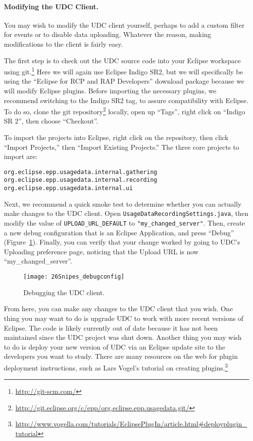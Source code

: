 \paragraph{Modifying the UDC Client.}

You may wish to modify the UDC client yourself, perhaps to add a custom filter for events
or to disable data uploading.
Whatever the reason, making modifications to the client is fairly easy.

The first step is to check out the UDC source code into your Eclipse
workspace using git.\footnote{\url{http://git-scm.com/}}
Here we will again use Eclipse Indigo SR2, but we will specifically be using the
``Eclipse for RCP and RAP Developers'' download package because we will
modify Eclipse plugins.
Before importing the necessary plugins, we recommend switching to
the Indigo SR2 tag, to assure compatibility with
Eclipse.
To do so, clone the git repository\footnote{\url{http://git.eclipse.org/c/epp/org.eclipse.epp.usagedata.git/}}
locally, open up ``Tags'', right click on ``Indigo SR 2'',
then choose ``Checkout''.

To import the projects into Eclipse, right click on the repository, then click
``Import Projects,'' then ``Import Existing Projects.''
The three core projects to import are:

\begin{lstlisting}
org.eclipse.epp.usagedata.internal.gathering
org.eclipse.epp.usagedata.internal.recording
org.eclipse.epp.usagedata.internal.ui
\end{lstlisting}

Next, we recommend a quick smoke test to determine whether you
can actually make changes to the UDC client.
Open \texttt{UsageDataRecordingSettings.java}, then modify the value of \texttt{UPLOAD\_URL\_DEFAULT}
to \texttt{"my\_changed\_server"}.
Then, create a new debug configuration that is an Eclipse Application, and press
``Debug'' (Figure~\ref{fig:debugconfig}).
Finally, you can verify that your change worked by going to UDC's Uploading
preference page, noticing that the Upload URL is now ``my\_changed\_server''.

\begin{figure}
  \centering
  \texttt{[image: 26Snipes\_debugconfig]}
  \caption{Debugging the UDC client.}\label{fig:debugconfig}
\end{figure}

From here, you can make any changes to the UDC client that you wish.
One thing you may want to do is upgrade UDC to work with more recent versions
of Eclipse.
The code is likely currently out of date
because it has not been maintained since the UDC project was shut down.
Another thing you may wish to do is deploy your new version of UDC via
an Eclipse update site to the developers you want to study.
There are many resources on the web for plugin deployment instructions,
such as Lars Vogel's tutorial on creating
plugins.\footnote{\url{http://www.vogella.com/tutorials/EclipsePlugIn/article.html\#deployplugin\_tutorial}}

